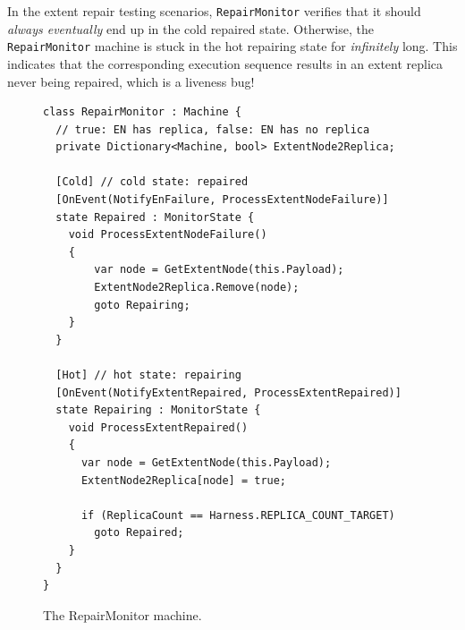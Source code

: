 
In the extent repair testing scenarios, \texttt{RepairMonitor} verifies that it should {\em always eventually} end up in the cold repaired state. Otherwise, the \texttt{RepairMonitor} machine is stuck in the hot repairing state for {\em infinitely} long. This indicates that the corresponding execution sequence results in an extent replica never being repaired, which is a liveness bug!

\begin{figure}[t]
\begin{lstlisting}
class RepairMonitor : Machine {
  // true: EN has replica, false: EN has no replica
  private Dictionary<Machine, bool> ExtentNode2Replica;

  [Cold] // cold state: repaired
  [OnEvent(NotifyEnFailure, ProcessExtentNodeFailure)]
  state Repaired : MonitorState {
    void ProcessExtentNodeFailure()
    {
        var node = GetExtentNode(this.Payload);
        ExtentNode2Replica.Remove(node);
        goto Repairing;
    }
  }

  [Hot] // hot state: repairing
  [OnEvent(NotifyExtentRepaired, ProcessExtentRepaired)]
  state Repairing : MonitorState {
    void ProcessExtentRepaired()
    {
      var node = GetExtentNode(this.Payload);
      ExtentNode2Replica[node] = true;

      if (ReplicaCount == Harness.REPLICA_COUNT_TARGET)
        goto Repaired;
    }
  }
}
\end{lstlisting}
\vspace{-2mm}
\caption{The RepairMonitor machine.}
\label{fig:monitor}
\end{figure}


